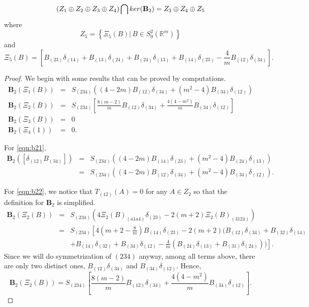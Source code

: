 \documentclass[10pt,a4paper]{amsart}
\newcommand{\Real}{\mathbb R}
\newcommand{\set}[1]{\left\{#1\right\}}
\begin{document}
\begin{lem}
	\label{lem:computeB2}
	\[
		(Z_1\oplus Z_2\oplus Z_3\oplus Z_4) \bigcap {\rm ker}({\mathbf B}_2)= Z_3\oplus Z_4\oplus Z_5 
	\]
	where
	\[
		Z_5= \set{\Xi_5(B)|\, B\in S_0^2(\Real^m)}
	\]
	and
	\[
		\Xi_5(B)= [B_{(23)}\delta_{(14)}+ B_{(13)}\delta_{(24)}+B_{(24)}\delta_{(13)}+B_{(14)}\delta_{(23)}-\frac{4}{m} B_{(12)}\delta_{(34)}].
	\]
\end{lem}

\begin{proof}
	We begin with some results that can be proved by computations.
	\begin{eqnarray}
		\label{eqn:b21}
		{\mathbf B}_2( \Xi_1(B))&=& S_{(234)}\left( (4-2m) B_{(12)}\delta_{(34)} + (m^2-4)B_{(34)}\delta_{(12)} \right) \\
		\label{eqn:b22}
		{\mathbf B}_2(\Xi_2(B)) &=& S_{(234)} [\frac{8(m-2)}{m}B_{(12)}\delta_{(34)} + \frac{4(4-m^2)}{m}B_{(34)}\delta_{(12)}] \\
		\label{eqn:b23}
		{\mathbf B}_2(\Xi_3(B)) &=& 0 \\
		\label{eqn:b24}
		{\mathbf B}_2(\Xi_4(1)) &=& 0.
	\end{eqnarray}

	For \eqref{eqn:b21},
	\begin{eqnarray*}
		{\mathbf B}_2( [\delta_{(12)}B_{(34)}])&=& S_{(234)}\left( (4-2m) B_{(14)}\delta_{(23)} + (m^2-4)B_{(24)}\delta_{(13)} \right)\\
						       &=& S_{(234)}\left( (4-2m) B_{(12)}\delta_{(34)} + (m^2-4)B_{(34)}\delta_{(12)} \right).
	\end{eqnarray*}

	For \eqref{eqn:b22}, we notice that $T_{(12)}(A)=0$ for any $A\in Z_2$ so that the definition for ${\mathbf B}_2$ is simplified.
	\begin{eqnarray*}
		{\mathbf B}_2( \Xi_2(B)) &=& S_{(234)} (4 \Xi_2(B)_{(a1a4)}\delta_{(23)} - 2(m+2) \Xi_2(B)_{(3124)}) \\
					 &=& S_{(234)}\left[ 4(m+2-\frac{8}{m})B_{(14)}\delta_{(23)} -2(m+2)( B_{(12)}\delta_{(34)}+B_{(32)}\delta_{(14)}\right. \\
					 && \left. +B_{(14)}\delta_{(32)}+B_{(34)}\delta_{(12)} -\frac{4}{m}(B_{(24)}\delta_{(13)}+B_{(31)}\delta_{(24)})) \right].
	\end{eqnarray*}
	Since we will do symmetrization of $(234)$ anyway, among all terms above, there are only two distinct ones, $B_{(12)}\delta_{(34)}$ and $B_{(34)}\delta_{(12)}$. Hence,
	\[
		{\mathbf B}_2(\Xi_2(B)) = S_{(234)} [\frac{8(m-2)}{m}B_{(12)}\delta_{(34)} + \frac{4(4-m^2)}{m}B_{(34)}\delta_{(12)}].
	\]


\end{proof}
\end{document}

